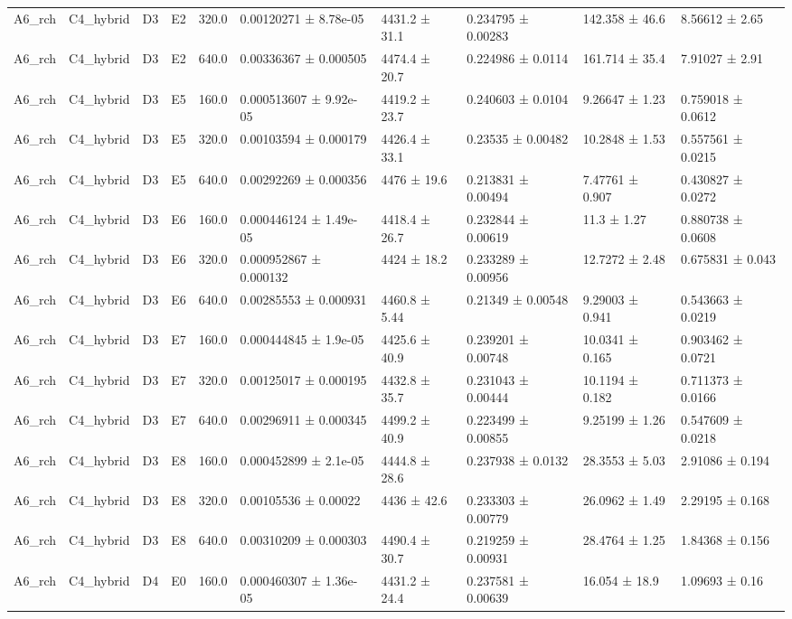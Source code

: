 \begin{table}
\begin{tabular}{llllllllll}
A6\_rch & C4\_hybrid & D3 & E2 & 320.0 & 0.00120271 ± 8.78e-05 & 4431.2 ± 31.1 & 0.234795 ± 0.00283 & 142.358 ± 46.6 & 8.56612 ± 2.65 \\
A6\_rch & C4\_hybrid & D3 & E2 & 640.0 & 0.00336367 ± 0.000505 & 4474.4 ± 20.7 & 0.224986 ± 0.0114 & 161.714 ± 35.4 & 7.91027 ± 2.91 \\
A6\_rch & C4\_hybrid & D3 & E5 & 160.0 & 0.000513607 ± 9.92e-05 & 4419.2 ± 23.7 & 0.240603 ± 0.0104 & 9.26647 ± 1.23 & 0.759018 ± 0.0612 \\
A6\_rch & C4\_hybrid & D3 & E5 & 320.0 & 0.00103594 ± 0.000179 & 4426.4 ± 33.1 & 0.23535 ± 0.00482 & 10.2848 ± 1.53 & 0.557561 ± 0.0215 \\
A6\_rch & C4\_hybrid & D3 & E5 & 640.0 & 0.00292269 ± 0.000356 & 4476 ± 19.6 & 0.213831 ± 0.00494 & 7.47761 ± 0.907 & 0.430827 ± 0.0272 \\
A6\_rch & C4\_hybrid & D3 & E6 & 160.0 & 0.000446124 ± 1.49e-05 & 4418.4 ± 26.7 & 0.232844 ± 0.00619 & 11.3 ± 1.27 & 0.880738 ± 0.0608 \\
A6\_rch & C4\_hybrid & D3 & E6 & 320.0 & 0.000952867 ± 0.000132 & 4424 ± 18.2 & 0.233289 ± 0.00956 & 12.7272 ± 2.48 & 0.675831 ± 0.043 \\
A6\_rch & C4\_hybrid & D3 & E6 & 640.0 & 0.00285553 ± 0.000931 & 4460.8 ± 5.44 & 0.21349 ± 0.00548 & 9.29003 ± 0.941 & 0.543663 ± 0.0219 \\
A6\_rch & C4\_hybrid & D3 & E7 & 160.0 & 0.000444845 ± 1.9e-05 & 4425.6 ± 40.9 & 0.239201 ± 0.00748 & 10.0341 ± 0.165 & 0.903462 ± 0.0721 \\
A6\_rch & C4\_hybrid & D3 & E7 & 320.0 & 0.00125017 ± 0.000195 & 4432.8 ± 35.7 & 0.231043 ± 0.00444 & 10.1194 ± 0.182 & 0.711373 ± 0.0166 \\
A6\_rch & C4\_hybrid & D3 & E7 & 640.0 & 0.00296911 ± 0.000345 & 4499.2 ± 40.9 & 0.223499 ± 0.00855 & 9.25199 ± 1.26 & 0.547609 ± 0.0218 \\
A6\_rch & C4\_hybrid & D3 & E8 & 160.0 & 0.000452899 ± 2.1e-05 & 4444.8 ± 28.6 & 0.237938 ± 0.0132 & 28.3553 ± 5.03 & 2.91086 ± 0.194 \\
A6\_rch & C4\_hybrid & D3 & E8 & 320.0 & 0.00105536 ± 0.00022 & 4436 ± 42.6 & 0.233303 ± 0.00779 & 26.0962 ± 1.49 & 2.29195 ± 0.168 \\
A6\_rch & C4\_hybrid & D3 & E8 & 640.0 & 0.00310209 ± 0.000303 & 4490.4 ± 30.7 & 0.219259 ± 0.00931 & 28.4764 ± 1.25 & 1.84368 ± 0.156 \\
A6\_rch & C4\_hybrid & D4 & E0 & 160.0 & 0.000460307 ± 1.36e-05 & 4431.2 ± 24.4 & 0.237581 ± 0.00639 & 16.054 ± 18.9 & 1.09693 ± 0.16 \\

\end{tabular}
\end{table}
